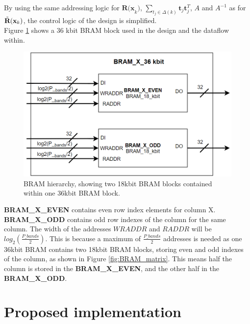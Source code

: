  By using the same addressing logic for $\textbf{R(x}_k)$, $\sum_{t_j\in\Delta(k)}\textbf{t}_j\textbf{t}_j^T$,  $A$ and $A^{-1}$  as for $\Tilde{\textbf{R}}(\textbf{x}_k)$, the control logic of the design is simplified. \\



Figure \ref{fig:BRAM_hierarchy} shows a 36 kbit BRAM block used in the design and the dataflow within.

\begin{figure}[H]
\centering

   \includegraphics[scale=0.5]{images/BRAM_two_18_kbit.PNG}
  \caption{BRAM hierarchy, showing two 18kbit BRAM blocks contained within one 36kbit BRAM block. } 
  \label{fig:BRAM_hierarchy}
\end{figure}

\textbf{BRAM\_X\_EVEN} contains even row index elements for column X. \textbf{BRAM\_X\_ODD} contains odd row indexes of the column for the same column. The width of the addresses $WRADDR$ and $RADDR$ will be $log_2(\frac{P\_bands}{2})$. This is because a maximum of $\frac{P\_bands}{2}$ addresses is needed as one 36kbit BRAM contains two 18kbit BRAM blocks, storing even and odd indexes of the column, as shown in Figure \ref{fig:BRAM_matrix}. This means half the column is stored in the \textbf{BRAM\_X\_EVEN}, and the other half in the \textbf{BRAM\_X\_ODD}. 







\section{Proposed implementation}

